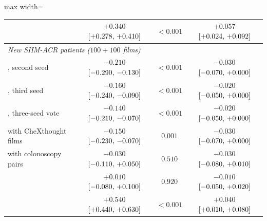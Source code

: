 \begin{table}[!htbp]
\begin{adjustbox}{max width=\linewidth}
\begin{tabular}{l cc c}
\gpt{} & $+0.340$ $[+0.278,\,+0.410]$ & $<0.001$ & $+0.057$ $[+0.024,\,+0.092]$ \\
\midrule
\multicolumn{4}{l}{\emph{New SIIM-ACR patients ($100 + 100$ films)}} \\
\msn{}, second seed & $-0.210$ $[-0.290,\,-0.130]$ & $<0.001$ & $-0.030$ $[-0.070,\,+0.000]$ \\
\msn{}, third seed & $-0.160$ $[-0.240,\,-0.090]$ & $<0.001$ & $-0.020$ $[-0.050,\,+0.000]$ \\
\msn{}, three-seed vote & $-0.140$ $[-0.210,\,-0.070]$ & $<0.001$ & $-0.020$ $[-0.050,\,+0.000]$ \\
\msp{} with CheXthought films & $-0.150$ $[-0.230,\,-0.070]$ & $0.001$ & $-0.030$ $[-0.070,\,+0.000]$ \\
\msp{} with colonoscopy pairs & $-0.030$ $[-0.110,\,+0.050]$ & $0.510$ & $-0.030$ $[-0.080,\,+0.010]$ \\
\msp{} & $+0.010$ $[-0.080,\,+0.100]$ & $0.920$ & $-0.010$ $[-0.050,\,+0.020]$ \\
\ms{} & $+0.540$ $[+0.440,\,+0.630]$ & $<0.001$ & $+0.040$ $[+0.010,\,+0.080]$ \\
\bottomrule
\end{tabular}
\end{adjustbox}
\end{table}

